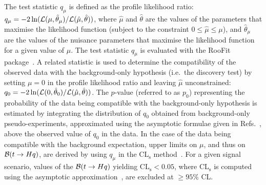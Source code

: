 The test statistic $q_\mu$ is defined as the profile likelihood ratio: 
$q_\mu = -2\ln({\cal L}(\mu,{\hat{\theta}}_\mu)/{\cal L}(\hat{\mu},\hat{\theta}))$,
where $\hat{\mu}$ and $\hat{\theta}$ are the values of the parameters that
maximise the likelihood function (subject to the constraint $0\leq \hat{\mu} \leq \mu$), and ${\hat{\theta}}_\mu$ are the values of the
nuisance parameters that maximise the likelihood function for a given value of $\mu$. 
The test statistic $q_\mu$ is evaluated with the {\textsc RooFit} package~\cite{Verkerke:2003ir,RooFitManual}.
A related statistic is used to determine the compatibility of the observed data with the background-only hypothesis (i.e.~the discovery test)  
by setting $\mu=0$ in the profile likelihood ratio and leaving $\hat{\mu}$ unconstrained: $q_0 = -2\ln({\cal L}(0,{\hat{\theta}}_0)/{\cal L}(\hat{\mu},\hat{\theta}))$.
The $p$-value (referred to as $p_0$) representing the probability of the data being compatible with the background-only hypothesis is estimated by integrating
the distribution of $q_0$ obtained from background-only pseudo-experiments, approximated using the asymptotic formulae given in Refs.~\cite{Cowan:2010js}, 
above the observed value of $q_0$ in the data. 
In the case of the data being compatible with the background expectation, upper limits on $\mu$, and thus on 
$\mathcal{B}(t\to Hq)$, are derived by using $q_\mu$ in the CL$_{\textrm{s}}$ method~\cite{Junk:1999kv,Read:2002hq}.
For a given signal scenario, values of the $\mathcal{B}(t\to Hq)$ yielding CL$_{\textrm{s}} < 0.05$, 
where CL$_{\textrm{s}}$ is computed using the asymptotic approximation~\cite{Cowan:2010js}, are excluded at $\geq 95\%$ CL.


